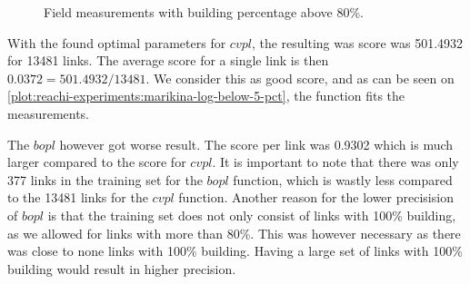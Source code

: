 \begin{figure}[H]
    \centering
    \caption{Field measurements with building percentage above 80\%.}
    \label{plot:reachi-experiments:marikina-log-above-80-pct}
\end{figure}

With the found optimal parameters for $\mathit{cvpl}$, the resulting was score was 501.4932 for 13481 links. The average score for a single link is then $0.0372 = 501.4932 / 13481$. We consider this as good score, and as can be seen on \autoref{plot:reachi-experiments:marikina-log-below-5-pct}, the function fits the measurements.\medbreak

The $\mathit{bopl}$ however got worse result. The score per link was 0.9302 which is much larger compared to the score for $\mathit{cvpl}$. It is important to note that there was only 377 links in the training set for the $\mathit{bopl}$ function, which is wastly less compared to the 13481 links for the $\mathit{cvpl}$ function. Another reason for the lower precisision of $\mathit{bopl}$ is that the training set does not only consist of links with 100\% building, as we allowed for links with more than 80\%. This was however necessary as there was close to none links with 100\% building. Having a large set of links with 100\% building would result in higher precision.

